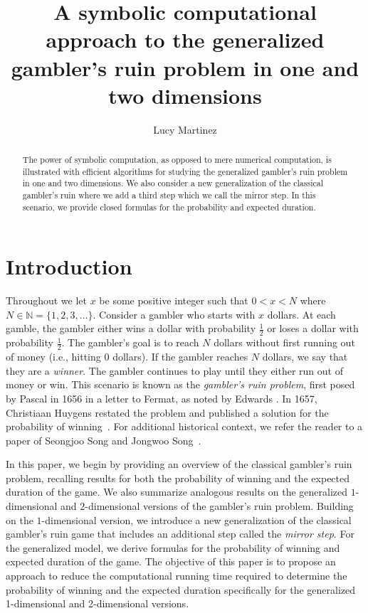 \documentclass[reqno]{amsart}
\title{A symbolic computational approach to the generalized gambler's ruin problem in one and two dimensions}
\author[Martinez]{Lucy Martinez}
\theoremstyle{definition}
\theoremstyle{definition}
\theoremstyle{remark}
\newcommand{\NN}{\mathbb{N}}
\begin{document}
\begin{abstract}
The power of symbolic computation, as opposed
to mere numerical computation, is illustrated with
efficient algorithms for studying the generalized gambler's ruin problem in one and two dimensions. We also consider a new generalization of the classical gambler's ruin where we add a third step which we call the mirror step. In this scenario, we provide closed formulas for the probability and expected duration.
\end{abstract}


\maketitle


\section{Introduction} 
Throughout we let $x$ be some positive integer such that $0< x < N$ where $N\in \NN=\{1,2,3,\ldots \}$. Consider a gambler who starts with $x$ dollars. At each gamble, the gambler either wins a dollar with probability $\frac{1}{2}$ or loses a dollar with probability $\frac{1}{2}$. The gambler's goal is to reach $N$ dollars without first running out of money (i.e., hitting $0$ dollars). If the gambler reaches $N$ dollars, we say that they are a \textit{winner}. The gambler continues to play until they either run out of money or win. This scenario is known as the \textit{gambler's ruin problem}, first posed by Pascal in 1656 in a letter to Fermat, as noted by Edwards \cite{Edwards1983}. In 1657, Christiaan Huygens restated the problem and published a solution for the probability of winning~\cite{Huygens}. For additional historical context, we refer the reader to a paper of Seongjoo Song and Jongwoo Song~\cite{Song}.

In this paper, we begin by providing an overview of the classical gambler's ruin problem, recalling results for both the probability of winning and the expected duration of the game. We also summarize analogous results on the generalized $1$-dimensional and $2$-dimensional versions of the gambler's ruin problem. Building on the $1$-dimensional version, we introduce a new generalization of the classical gambler's ruin game that includes an additional step called the \textit{mirror step}. For the generalized model, we derive formulas for the probability of winning and expected duration of the game. The objective of this paper is to propose an approach to reduce the computational running time required to determine the probability of winning and the expected duration specifically for the generalized 1-dimensional and 2-dimensional versions.
\end{document}
